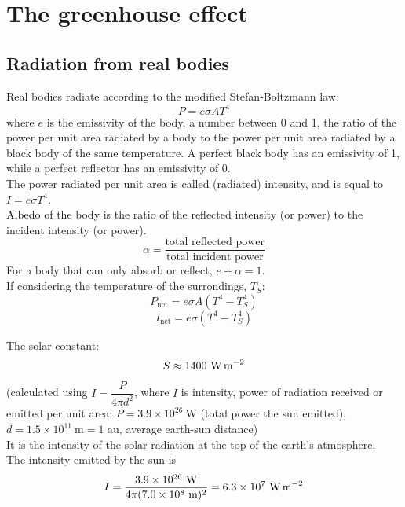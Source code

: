\documentclass[a4paper,12pt]{article}
\begin{document}
\section{The greenhouse effect}
\subsection{Radiation from real bodies}
Real bodies radiate according to the modified Stefan-Boltzmann law:
\[P=e\sigma AT^4\]
where $e$ is the emissivity of the body, a number between 0 and 1, the ratio of the power per unit area radiated by a body to the power per unit area radiated by a black body of the same temperature. A perfect black body has an emissivity of 1, while a perfect reflector has an emissivity of 0.\\
The power radiated per unit area is called (radiated) intensity, and is equal to $I=e\sigma T^4$.\\
Albedo of the body is the ratio of the reflected intensity (or power) to the incident intensity (or power).
\[\alpha=\dfrac{\text{total reflected power}}{\text{total incident power}}\]
For a body that can only absorb or reflect, $e+\alpha=1$.\\
If considering the temperature of the surrondings, $T_S$:
\[P_\text{net}=e\sigma A(T^4-T_S^4)\]
\[I_\text{net}=e\sigma (T^4-T_S^4)\]
\begin{center}
\end{center}
The solar constant:
\[S\approx 1400\ \text{W\,m}^{-2}\]
(calculated using $I=\dfrac{P}{4\pi d^2}$, where $I$ is intensity, power of radiation received or emitted per unit area; $P=3.9\times 10^{26}\ \text{W}$ (total power the sun emitted), $d=1.5\times 10^{11}\ \text{m}=1$ au, average earth-sun distance)\\
It is the intensity of the solar radiation at the top of the earth's atmosphere.\\
The intensity emitted by the sun is
\[I=\dfrac{3.9\times 10^{26}\ \text{W}}{4\pi (7.0\times 10^8\ \text{m})^2}=6.3\times 10^7\ \text{W\,m}^{-2}\]
\end{document}
